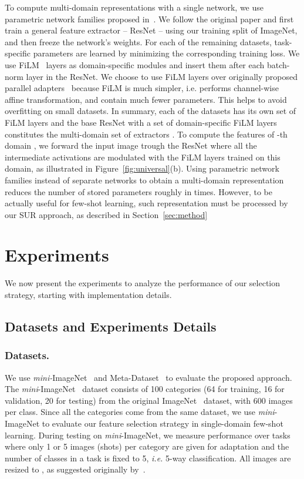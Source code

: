 \documentclass[runningheads]{llncs}
\begin{document}
To compute multi-domain representations with a single network, we use parametric
network families proposed in~\cite{rebuffi2018efficient}. We follow the original
paper and first train a general feature extractor -- ResNet -- using our training
split of ImageNet, and then freeze the network's weights. For each of the 
remaining datasets, task-specific parameters are learned by minimizing the
corresponding training loss. We use FiLM~\cite{perez2018film} layers as
domain-specific modules and insert them after each batch-norm layer in the
ResNet. We choose to use FiLM layers over originally proposed parallel
adapters~\cite{rebuffi2018efficient} because FiLM is much simpler, i.e. performs
channel-wise affine transformation, and contain much fewer parameters. This
helps to avoid overfitting on small datasets.
In summary, each of the  datasets has
its own set of FiLM layers and the base ResNet with a set of domain-specific FiLM
layers constitutes the multi-domain set of extractors . To
compute the features of -th domain , we forward the input image 
trough the ResNet where all the intermediate activations are modulated with the
FiLM layers trained on this domain, as illustrated in
Figure~\ref{fig:universal}(b). Using parametric network families instead of 
separate networks to obtain a multi-domain representation reduces the number of
stored parameters roughly in  times. However, to be actually useful for
few-shot learning, such representation must be processed by our SUR approach, as
described in Section~\ref{sec:method}

 
\section{Experiments}
We now present the experiments to analyze the performance
of our selection strategy, starting with implementation details.

\subsection{Datasets and Experiments Details}\label{sec:details}
\subsubsection{Datasets.} We use \textit{mini-}ImageNet~\cite{ravioptimization} and 
Meta-Dataset~\cite{triantafillou2019meta} to evaluate the proposed approach. The
\textit{mini}-ImageNet~\cite{ravioptimization} dataset consists of 100 categories (64 for
training, 16 for validation, 20 for testing) from the original
ImageNet~\cite{imagenet} dataset, with 600 images per class. Since all the
categories come from the same dataset, we use \textit{mini}-ImageNet to
evaluate our feature selection strategy in
single-domain few-shot learning. During testing on
\textit{mini}-ImageNet, we measure performance over tasks where only 1 or 5
images (shots) per category are given for adaptation and the number of classes
in a task is fixed to 5, \textit{i.e.} 5-way classification. All images are resized to
, as suggested originally by~\cite{ravioptimization}.
\end{document}
